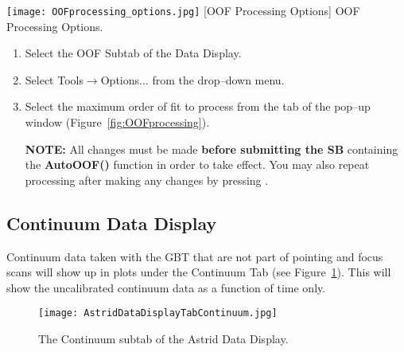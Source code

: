 \begin{center}
\noindent\begin{minipage}[t]{0.19\linewidth}
\setlength{\abovecaptionskip}{0pt}
\setlength{\belowcaptionskip}{0pt}
\vspace{0pt}
\texttt{[image: OOFprocessing\_options.jpg]}
[OOF Processing Options]
{OOF Processing Options.
\label{fig:OOFprocessing}}
\end{minipage}
\begin{minipage}[t]{0.7\linewidth}
\vspace{0pt}
\begin{enumerate}[label=\bfseries{Step \arabic*.},leftmargin=*,itemsep=0pt]
\item Select the OOF Subtab of the Data Display.
\item Select {\btt Tools}$\rightarrow${\btt Options...} from the drop--down menu.
\item Select the maximum order of fit to process from the \newline
{} tab of the pop--up window (Figure~\ref{fig:OOFprocessing}).
\item[{\bf NOTE:}] All changes must be made {\bf before submitting the \gls{SB}}
containing the \textbf{\textcolor{pythonKeywords}{AutoOOF}()} function in order to take
effect.  You may also repeat processing after making any changes by pressing
.
\end{enumerate}
\end{minipage}
\end{center}


\newpage

\subsection{Continuum Data Display}

Continuum data taken with the \gls{GBT} that are not part of pointing and focus
scans will show up in plots under the Continuum Tab
(see Figure~\ref{fig:astridcontinuum}).  This will show the uncalibrated continuum
data as a function of time only.

\begin{figure}[!h]
\begin{center}
\texttt{[image: AstridDataDisplayTabContinuum.jpg]}
\caption[The Continuum subtab of the Astrid Data Display]
{The Continuum subtab of the \gls{Astrid} Data Display.\label{fig:astridcontinuum} }
\end{center}
\end{figure}

